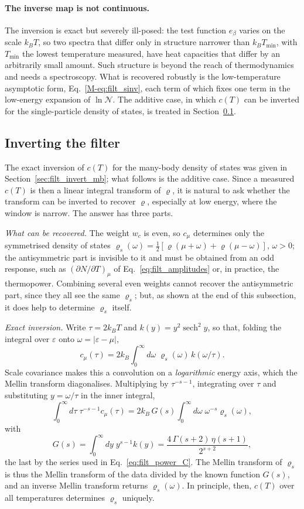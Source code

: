 \documentclass[10pt,a4paper]{article}
\theoremstyle{plain}
\theoremstyle{remark}
\newcommand{\cN}{\mathcal{N}}   %
\begin{document}
\paragraph{The inverse map is not continuous.} The inversion is exact but
severely ill-posed: the test function $e_\beta$ varies on the scale $k_BT$,
so two spectra that differ only in structure narrower than $k_BT_{\min}$,
with $T_{\min}$ the lowest temperature measured, have heat capacities that
differ by an arbitrarily small amount. Such structure is beyond the reach of
thermodynamics and needs a spectroscopy. What is recovered robustly is the
low-temperature asymptotic form, Eq.~\eqref{M-eq:filt_sinv}, each term of
which fixes one term in the low-energy expansion of $\ln\cN$. The additive
case, in which $c(T)$ can be inverted for the single-particle density of
states, is treated in Section~\ref{sec:filt_invert}.

\subsection{Inverting the filter}
\label{sec:filt_invert}

The exact inversion of $ c(T) $ for the many-body density of states was given in
Section~\ref{sec:filt_invert_mb}; what follows is the additive case.
Since a measured $ c(T) $ is then a linear integral transform of
$ \varrho $, it is natural to ask whether the transform can be inverted to recover $ \varrho $,
especially at low energy, where the window is narrow. The answer has three parts.

\emph{What can be recovered.} The weight $ w_c $ is even, so $ c_\mu $ determines
only the symmetrised density of states $ \varrho_s(\omega) =
\tfrac12[\varrho(\mu + \omega) + \varrho(\mu - \omega)] $, $ \omega > 0 $; the
antisymmetric part is invisible to it and must be obtained from an odd response, such
as $ (\partial N/\partial T)_\mu $ of Eq.~\eqref{eq:filt_amplitudes} or, in practice, the
thermopower. Combining several even weights cannot recover the antisymmetric part,
since they all see the same $ \varrho_s $; but, as shown at the end of this
subsection, it does help to determine $ \varrho_s $ itself.

\emph{Exact inversion.} Write $ \tau = 2k_BT $ and $ k(y) = y^{2}\operatorname{sech}^{2}y $,
so that, folding the integral over $ \varepsilon $ onto $ \omega = |\varepsilon - \mu| $,
\[
  c_\mu(\tau) = 2k_B\int_0^{\infty} d\omega\;\varrho_s(\omega)\,k(\omega/\tau) .
\]
Scale covariance makes this a convolution on a \emph{logarithmic} energy axis, which
the Mellin transform diagonalises. Multiplying by $ \tau^{-s-1} $, integrating over
$ \tau $ and substituting $ y = \omega/\tau $ in the inner integral,
\[
  \int_0^{\infty} d\tau\;\tau^{-s-1}c_\mu(\tau)
  = 2k_B\,G(s)\int_0^{\infty} d\omega\;\omega^{-s}\varrho_s(\omega),
\]
with
\[
  G(s) = \int_0^{\infty} dy\; y^{s-1}k(y) = \frac{4\,\Gamma(s+2)\,\eta(s+1)}{2^{s+2}} ,
\]
the last by the series used in Eq.~\eqref{eq:filt_power_C}. The Mellin transform of
$ \varrho_s $ is thus the Mellin transform of the data divided by the known function
$ G(s) $, and an inverse Mellin transform returns $ \varrho_s(\omega) $. In principle,
then, $ c(T) $ over all temperatures determines $ \varrho_s $ uniquely.
\end{document}
